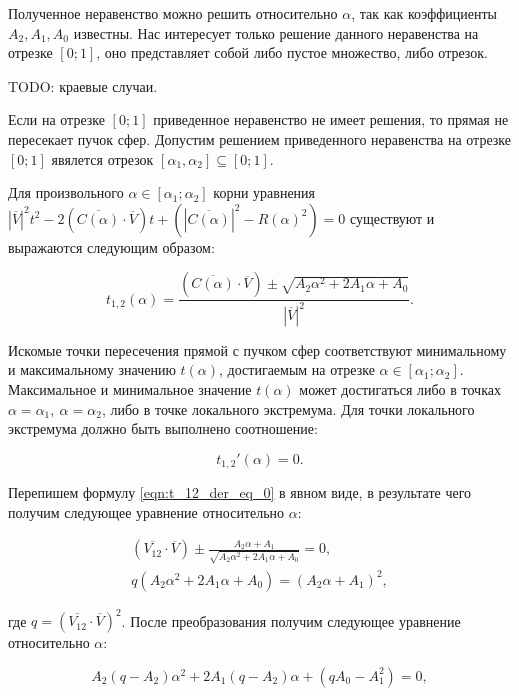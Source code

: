 \documentclass[a4paper,10pt]{extarticle}                     %
\numberwithin{equation}{section}                             %
\numberwithin{figure}{section}                               %
\theoremstyle{plain}                                         %
\begin{document}
Полученное неравенство можно решить относительно $\alpha$, так как коэффициенты $A_2, A_1, A_0$ известны.
Нас интересует только решение данного неравенства на отрезке $[0; 1]$, оно представляет собой либо пустое множество, либо отрезок.

TODO: краевые случаи.

Если на отрезке $[0; 1]$ приведенное неравенство не имеет решения, то прямая не пересекает пучок сфер.
Допустим решением приведенного неравенства на отрезке $[0; 1]$ явялется отрезок $[\alpha_1, \alpha_2] \subseteq [0; 1]$.

Для произвольного $\alpha \in [\alpha_1; \alpha_2]$ корни уравнения ${|\overline{V}|}^2t^2 - 2(\overline{C(\alpha)}\cdot\overline{V})t + ({|\overline{C(\alpha)}|}^2 - R(\alpha)^2) = 0$ существуют и выражаются следующим образом:

\begin{equation}
    t_{1,2}(\alpha) = \frac{(\overline{C(\alpha)}\cdot\overline{V}) \pm \sqrt{A_2\alpha^2 + 2A_1\alpha + A_0}}{|\overline{V}|^2}.
\end{equation}

Искомые точки пересечения прямой с пучком сфер соответствуют минимальному и максимальному значению $t(\alpha)$, достигаемым на отрезке $\alpha \in [\alpha_1; \alpha_2]$.
Максимальное и минимальное значение $t(\alpha)$ может достигаться либо в точках $\alpha = \alpha_1, \ \alpha = \alpha_2$, либо в точке локального экстремума.
Для точки локального экстремума должно быть выполнено соотношение:

\begin{equation}\label{eqn:t_12_der_eq_0}
    t_{1,2}'(\alpha) = 0.
\end{equation}

Перепишем формулу \ref{eqn:t_12_der_eq_0} в явном виде, в результате чего получим следующее уравнение относительно $\alpha$:

\begin{eqnarray}
    (\overline{V_{12}}\cdot\overline{V}) \pm \frac{A_2\alpha + A_1}{\sqrt{A_2\alpha^2 + 2A_1\alpha + A_0}} = 0, \\
    q(A_2\alpha^2 + 2A_1\alpha + A_0) = (A_2\alpha + A_1)^2,
\end{eqnarray}

где $q = (\overline{V_{12}}\cdot\overline{V})^2$.
После преобразования получим следующее уравнение относительно $\alpha$:

\begin{equation}\label{eqn:alpha_eqn}
    A_2(q - A_2)\alpha^2 + 2A_1(q - A_2)\alpha + (qA_0 - A_1^2) = 0,
\end{equation}
\end{document}
